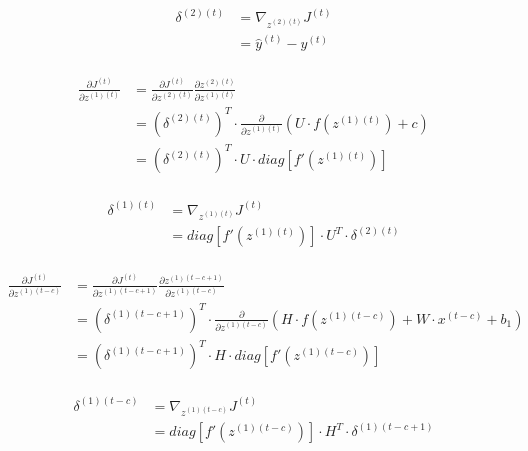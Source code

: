 \documentclass{article}
\begin{document}
	\begin{equation}
	\begin{aligned}
		\delta^{(2)(t)} &= \nabla_{z^{(2)(t)}} J^{(t)} \\
		&= \hat{y}^{(t)} - y^{(t)} \\
	\end{aligned}
	\end{equation}
	
	\begin{equation}
		\begin{aligned}
		\frac{\partial J^{(t)}}{\partial z^{(1)(t)}} &= \frac{\partial J^{(t)}}{\partial z^{(2)(t)}} 
		\frac{\partial z^{(2)(t)}}{\partial z^{(1)(t)}} \\
		&= (\delta^{(2)(t)})^T \cdot \frac{\partial}{\partial z^{(1)(t)}} (U \cdot f(z^{(1)(t)}) + c)\\
		&= (\delta^{(2)(t)})^T \cdot U \cdot diag[f'(z^{(1)(t)})]\\
		\end{aligned}
	\end{equation}
	
	\begin{equation}
	\begin{aligned}
		\delta^{(1)(t)} &= \nabla_{z^{(1)(t)}} J^{(t)} \\
		&= diag[f'(z^{(1)(t)})] \cdot U^T \cdot \delta^{(2)(t)}\\
	\end{aligned}
	\end{equation}
	
	\begin{equation}
		\begin{aligned}
		\frac{\partial J^{(t)}}{\partial z^{(1)(t-c)}} &= \frac{\partial J^{(t)}}{\partial z^{(1)(t-c+1)}} 
		\frac{\partial z^{(1)(t-c+1)}}{\partial z^{(1)(t-c)}} \\
		&= (\delta^{(1)(t-c+1)})^T \cdot \frac{\partial}{\partial z^{(1)(t-c)}} (H \cdot f(z^{(1)(t-c)}) + W \cdot x^{(t-c)} + b_1)\\
		&= (\delta^{(1)(t-c+1)})^T \cdot H \cdot diag[f'(z^{(1)(t-c)})]\\
		\end{aligned}
	\end{equation}
	
	\begin{equation}
		\begin{aligned}
		\delta^{(1)(t-c)} &= \nabla_{z^{(1)(t-c)}} J^{(t)} \\
		&= diag[f'(z^{(1)(t-c)})] \cdot H^T \cdot \delta^{(1)(t-c+1)}\\
		\end{aligned}
	\end{equation}
	
\end{document}
